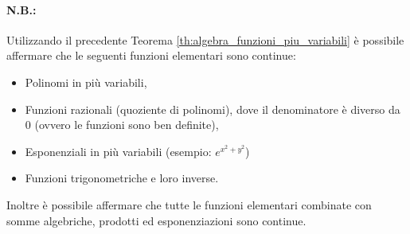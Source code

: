 \paragraph{N.B.:} Utilizzando il precedente Teorema \ref{th:algebra_funzioni_piu_variabili} è possibile affermare che le seguenti funzioni elementari sono continue:
\begin{itemize}
    \item Polinomi in più variabili,
    \item Funzioni razionali (quoziente di polinomi), dove il denominatore è diverso da 0 (ovvero le funzioni sono ben definite),
    \item Esponenziali in più variabili (esempio: $e^{x^2+y^2}$)
    \item Funzioni trigonometriche e loro inverse.
\end{itemize}
Inoltre è possibile affermare che tutte le funzioni elementari combinate con somme algebriche, prodotti ed esponenziazioni sono continue.

